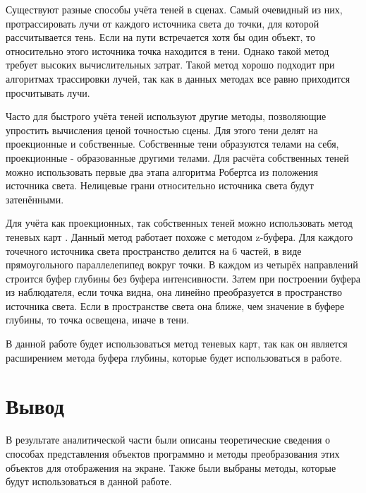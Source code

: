Существуют разные способы учёта теней в сценах. Самый очевидный из них, протрассировать лучи от каждого источника света до точки, для которой рассчитывается тень. Если на пути встречается хотя бы один объект, то относительно этого источника точка находится в тени. Однако такой метод требует высоких вычислительных затрат. Такой метод хорошо подходит при алгоритмах трассировки лучей, так как в данных методах все равно приходится просчитывать лучи.

Часто для быстрого учёта теней используют другие методы, позволяющие упростить вычисления ценой точностью сцены. Для этого тени делят на проекционные и собственные. Собственные тени образуются телами на себя, проекционные - образованные другими телами. Для расчёта собственных теней можно использовать первые два этапа алгоритма Робертса из положения источника света. Нелицевые грани относительно источника света будут затенёнными.

Для учёта как проекционных, так собственных теней можно использовать метод теневых карт \cite{gabriella}. Данный метод работает похоже с методом z-буфера. Для каждого точечного источника света пространство делится на 6 частей, в виде прямоугольного параллелепипед вокруг точки. В каждом из четырёх направлений строится буфер глубины без буфера интенсивности. Затем при построении буфера из наблюдателя, если точка видна, она линейно преобразуется в пространство источника света. Если в пространстве света она ближе, чем значение в буфере глубины, то точка освещена, иначе в тени.

В данной работе будет использоваться метод теневых карт, так как он является расширением метода буфера глубины, которые будет использоваться в работе.

\section*{Вывод}

В результате аналитической части были описаны теоретические сведения о способах представления объектов программно и методы преобразования этих объектов для отображения на экране. Также были выбраны методы, которые будут использоваться в данной работе.

\clearpage
